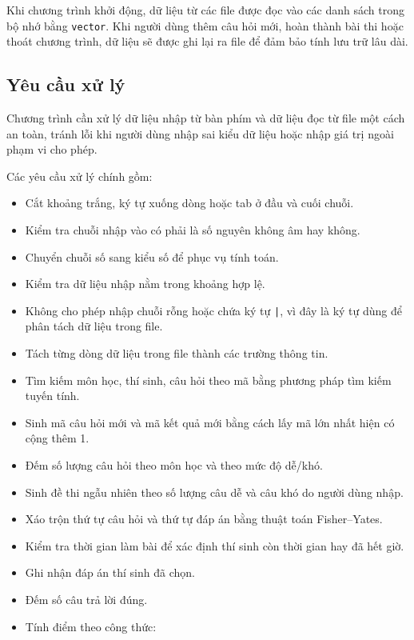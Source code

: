 \documentclass[12pt,a4paper]{report}
\begin{document}
Khi chương trình khởi động, dữ liệu từ các file được đọc vào các danh sách trong bộ nhớ bằng \texttt{vector}. Khi người dùng thêm câu hỏi mới, hoàn thành bài thi hoặc thoát chương trình, dữ liệu sẽ được ghi lại ra file để đảm bảo tính lưu trữ lâu dài.

\subsection{Yêu cầu xử lý}

Chương trình cần xử lý dữ liệu nhập từ bàn phím và dữ liệu đọc từ file một cách an toàn, tránh lỗi khi người dùng nhập sai kiểu dữ liệu hoặc nhập giá trị ngoài phạm vi cho phép.

Các yêu cầu xử lý chính gồm:

\begin{itemize}
    \item Cắt khoảng trắng, ký tự xuống dòng hoặc tab ở đầu và cuối chuỗi.
    \item Kiểm tra chuỗi nhập vào có phải là số nguyên không âm hay không.
    \item Chuyển chuỗi số sang kiểu số để phục vụ tính toán.
    \item Kiểm tra dữ liệu nhập nằm trong khoảng hợp lệ.
    \item Không cho phép nhập chuỗi rỗng hoặc chứa ký tự \texttt{|}, vì đây là ký tự dùng để phân tách dữ liệu trong file.
    \item Tách từng dòng dữ liệu trong file thành các trường thông tin.
    \item Tìm kiếm môn học, thí sinh, câu hỏi theo mã bằng phương pháp tìm kiếm tuyến tính.
    \item Sinh mã câu hỏi mới và mã kết quả mới bằng cách lấy mã lớn nhất hiện có cộng thêm 1.
    \item Đếm số lượng câu hỏi theo môn học và theo mức độ dễ/khó.
    \item Sinh đề thi ngẫu nhiên theo số lượng câu dễ và câu khó do người dùng nhập.
    \item Xáo trộn thứ tự câu hỏi và thứ tự đáp án bằng thuật toán Fisher--Yates.
    \item Kiểm tra thời gian làm bài để xác định thí sinh còn thời gian hay đã hết giờ.
    \item Ghi nhận đáp án thí sinh đã chọn.
    \item Đếm số câu trả lời đúng.
    \item Tính điểm theo công thức:
\end{itemize}
\end{document}
